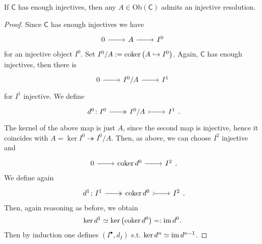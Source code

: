 \documentclass[../Main]{subfiles}
\begin{document}
\begin{prop}[]
	If $\mathsf{C}$ has enough injectives, then any
	$A \in \mathrm{Ob} \left(\mathsf{C}\right)$ admits an injective resolution.
\end{prop}
\begin{proof}
	Since $\mathsf{C}$ has enough injectives we have
	\begin{equation}
	\begin{tikzcd}
		0 \arrow[r, "", rightarrow] &
		A \arrow[r, "", rightarrow] &
		I^0
	\end{tikzcd}
	\end{equation} 
	for an injective object $I^0$.
	Set $I^0/A := \operatorname{coker} \left( A \hookrightarrow I^0 \right)$.
	Again, $\mathsf{C}$ has enough injectives, then there is
	\begin{equation}
	\begin{tikzcd}
		0 \arrow[r, "", rightarrow] &
		I^0/A \arrow[r, "", rightarrow] &
		I^1
	\end{tikzcd}
	\end{equation} 
	for $I^1$ injective.
	We define
	\begin{equation}
	\begin{tikzcd}
		d^0 \colon I^0 \arrow[r, "", twoheadrightarrow] &
		I^0/A \arrow[r, "", rightarrowtail] &
		I^1
	\end{tikzcd}
	.\end{equation} 
	The kernel of the above map is just $A$, since the second map is injective, hence it coincides with
	$A = \ker I^0 \twoheadrightarrow I^0/A$.
	Then, as above, we can choose $I^2$ injective and
	\begin{equation}
	\begin{tikzcd}
		0 \arrow[r, "", rightarrow] &
		\coker d^0 \arrow[r, "", rightarrow] &
		I^2
	\end{tikzcd}
	.\end{equation} 
	We define again
	\begin{equation}
	\begin{tikzcd}
		d^1 \colon I^1 \arrow[r, "", twoheadrightarrow] &
		\coker d^0 \arrow[r, "", rightarrowtail] &
		I^2
	\end{tikzcd}
	.\end{equation} 
	Then, again reasoning as before, we obtain
	\begin{equation}
		\ker d^1 \simeq \ker \left( \operatorname{coker} d^0 \right) =: \operatorname{im} d^0
	.\end{equation} 
	Then by induction one defines $\left( I^{\bullet}, d_{I} \right)$
	s.t. $\ker d^n \simeq \operatorname{im} d^{n-1}$.
\end{proof}
\end{document}
